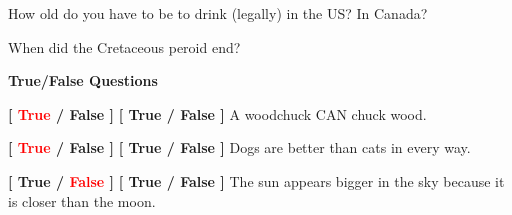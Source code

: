 \documentclass[10pt,answers,addpoints]{exam}
\begin{document}
\begin{questions}
\par\vspace{0.100000in}\begin{minipage}{\linewidth}
\vspace{.35cm}\question[2]
How old do you have to be to drink (legally) in the US?  In Canada?
\vspace{.25cm}\setlength\answerlinelength{3in}
\answerline[21]
\answerline[18]
\end{minipage}


\par\vspace{0.100000in}\begin{minipage}{\linewidth}
\vspace{.35cm}\question[2]
When did the Cretaceous peroid end?
\vspace{.25cm}\setlength\answerlinelength{3in}
\end{minipage}





\newpage
\begin{center}
{\Large \textbf{True/False Questions}}
\end{center}

\par\vspace{0.100000in}\begin{minipage}{\linewidth}
\question[1]
\ifprintanswers
\textbf{[ \textcolor{red}{True} / False ]} \else
\textbf{[ True / False ]} \fi
A woodchuck CAN chuck wood.
\medskip
\end{minipage}


\par\vspace{0.100000in}\begin{minipage}{\linewidth}
\question[1]
\ifprintanswers
\textbf{[ \textcolor{red}{True} / False ]} \else
\textbf{[ True / False ]} \fi
Dogs are better than cats in every way.
\medskip
\end{minipage}


\par\vspace{0.100000in}\begin{minipage}{\linewidth}
\question[1]
\ifprintanswers
\textbf{[ True / \textcolor{red}{False} ]} \else
\textbf{[ True / False ]} \fi
The sun appears bigger in the sky because it is closer than the moon.
\medskip
\end{minipage}



\end{questions}
\end{document}
